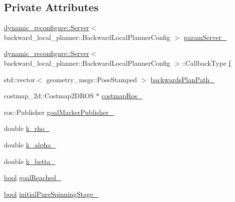 \subsection*{Private Attributes}
\begin{DoxyCompactItemize}
\item 
\hyperlink{tool__action__server__node_8cpp_ab5d66ae48b02f831fb527e5260ce1ed2}{dynamic\+\_\+reconfigure\+::\+Server}$<$ backward\+\_\+local\+\_\+planner\+::\+Backward\+Local\+Planner\+Config $>$ \hyperlink{classbackward__local__planner_1_1BackwardLocalPlanner_a953b593550c975f1c9caf0ed0c3143a5}{param\+Server\+\_\+}
\item 
\hyperlink{tool__action__server__node_8cpp_ab5d66ae48b02f831fb527e5260ce1ed2}{dynamic\+\_\+reconfigure\+::\+Server}$<$ backward\+\_\+local\+\_\+planner\+::\+Backward\+Local\+Planner\+Config $>$\+::Callback\+Type \hyperlink{classbackward__local__planner_1_1BackwardLocalPlanner_a6ef8d7b45a368abb6561ffd76f46f098}{f}
\item 
std\+::vector$<$ geometry\+\_\+msgs\+::\+Pose\+Stamped $>$ \hyperlink{classbackward__local__planner_1_1BackwardLocalPlanner_aaa37c16e1735cb440986b3d41e6ef8e6}{backwards\+Plan\+Path\+\_\+}
\item 
costmap\+\_\+2d\+::\+Costmap2\+D\+R\+OS $\ast$ \hyperlink{classbackward__local__planner_1_1BackwardLocalPlanner_a0d1ac7384b0b241f4b77a0490165430a}{costmap\+Ros\+\_\+}
\item 
ros\+::\+Publisher \hyperlink{classbackward__local__planner_1_1BackwardLocalPlanner_aec215b9441f9ac359ea6a531339ac4f8}{goal\+Marker\+Publisher\+\_\+}
\item 
double \hyperlink{classbackward__local__planner_1_1BackwardLocalPlanner_a4060acf69c2590984eb87d8e04a82699}{k\+\_\+rho\+\_\+}
\item 
double \hyperlink{classbackward__local__planner_1_1BackwardLocalPlanner_ab8a4ea2b7fe9f21c07acac7121d4dd3e}{k\+\_\+alpha\+\_\+}
\item 
double \hyperlink{classbackward__local__planner_1_1BackwardLocalPlanner_a655def0b0657ac145737cd72229ad82a}{k\+\_\+betta\+\_\+}
\item 
\hyperlink{classbool}{bool} \hyperlink{classbackward__local__planner_1_1BackwardLocalPlanner_a42fdfaf0d3eb1edb71a225ec7caf62d0}{goal\+Reached\+\_\+}
\item 
\hyperlink{classbool}{bool} \hyperlink{classbackward__local__planner_1_1BackwardLocalPlanner_ae03594253808527b547901baa5480d41}{initial\+Pure\+Spinning\+Stage\+\_\+}
\item 

\end{DoxyCompactItemize}
